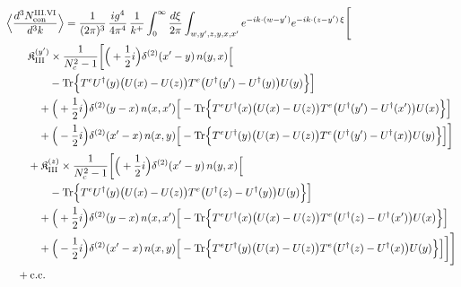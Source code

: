 \begingroup\small
\begin{align}\label{eq:S-III.VI-2}
&\Big\langle\frac{d^{3}N^{\rm III.VI}_{{\rm con}}}{d^{3}k}\Big\rangle=\frac{1}{(2\pi)^{3}}\, \frac{ig^{4}}{4\pi^{4}}\, \frac{1}{k^{+}} \int_{0}^{\infty}\frac{d\xi}{2\pi} \int_{w,y',z,y,x,x'}e^{-ik\cdot(w-y')}e^{-ik\cdot(z-y')\,\xi}\Bigg[\notag\\
&\quad\quad \mathfrak{K}^{(y')}_{\rm III} \times \frac{1}{N_{c}^{2}-1}\bigg[\Big(+\frac{1}{2}i\Big)\delta^{(2)}(x'-y)\, n(y,x)\Big[\notag\\
&\quad\quad\quad\quad -{\rm Tr}\Big\{T^{e}U^{\dagger}(y)\big(U(x)-U(z)\big)T^{e}\big(U^{\dagger}(y')-U^{\dagger}(y)\big)U(y)\Big\}\Big]\notag\\
&\quad\quad\quad +\Big(+\frac{1}{2}i\Big)\delta^{(2)}(y-x)\, n(x,x')\Big[ -{\rm Tr}\Big\{T^{e}U^{\dagger}(x)\big(U(x)-U(z)\big)T^{e}\big(U^{\dagger}(y')-U^{\dagger}(x')\big)U(x)\Big\}\Big]\notag\\
&\quad\quad\quad +\Big(-\frac{1}{2}i\Big)\delta^{(2)}(x'-x)\, n(x,y)\Big[ -{\rm Tr}\Big\{T^{e}U^{\dagger}(y)\big(U(x)-U(z)\big)T^{e}\big(U^{\dagger}(y')-U^{\dagger}(x)\big)U(y)\Big\}\Big]\bigg]\notag\\
&\quad\quad + \mathfrak{K}^{(z)}_{\rm III} \times \frac{1}{N_{c}^{2}-1}\bigg[\Big(+\frac{1}{2}i\Big)\delta^{(2)}(x'-y)\, n(y,x)\Big[\notag\\
&\quad\quad\quad\quad -{\rm Tr}\Big\{T^{e}U^{\dagger}(y)\big(U(x)-U(z)\big)T^{e}\big(U^{\dagger}(z)-U^{\dagger}(y)\big)U(y)\Big\}\Big]\notag\\
&\quad\quad\quad +\Big(+\frac{1}{2}i\Big)\delta^{(2)}(y-x)\, n(x,x')\Big[ -{\rm Tr}\Big\{T^{e}U^{\dagger}(x)\big(U(x)-U(z)\big)T^{e}\big(U^{\dagger}(z)-U^{\dagger}(x')\big)U(x)\Big\}\Big]\notag\\
&\quad\quad\quad +\Big(-\frac{1}{2}i\Big)\delta^{(2)}(x'-x)\, n(x,y)\Big[ -{\rm Tr}\Big\{T^{e}U^{\dagger}(y)\big(U(x)-U(z)\big)T^{e}\big(U^{\dagger}(z)-U^{\dagger}(x)\big)U(y)\Big\}\Big]\bigg]\Bigg]\notag\\
&\quad +{\rm c.c.}
\end{align}
\endgroup
